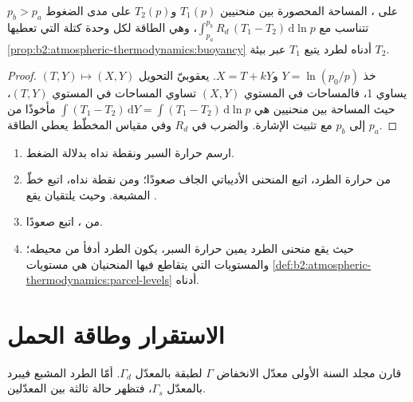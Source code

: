 \begin{proposition}\label{prop:b2:atmospheric-thermodynamics:areas}
على ، المساحة المحصورة بين منحنيين $T_1(p)$ و$T_2(p)$ على مدى
الضغوط $p_b > p_a$ تتناسب مع $\int_{p_a}^{p_b} R_d\,(T_1 - T_2)\,\mathrm{d}\ln p$،
وهي الطاقة لكل وحدة كتلة التي تعطيها \cref{prop:b2:atmospheric-thermodynamics:buoyancy} أدناه
لطرد يتبع $T_1$ عبر بيئة $T_2$.
\end{proposition}

\begin{proof}
خذ $Y = \ln(p_0/p)$ و$X = T + kY$. يعقوبيّ التحويل $(T, Y) \mapsto (X, Y)$ يساوي 1، فالمساحات في
المستوي $(X, Y)$ تساوي المساحات في المستوي $(T, Y)$، حيث المساحة بين منحنيين هي
$\int (T_1 - T_2)\,\mathrm{d}Y = \int (T_1 - T_2)\,\mathrm{d}\ln p$ مأخوذًا من $p_a$ إلى $p_b$
مع تثبيت الإشارة. والضرب في $R_d$ وفي مقياس المخطّط يعطي الطاقة.
\end{proof}

\begin{method}\label{met:b2:atmospheric-thermodynamics:lift}
\begin{enumerate}
  \item ارسم حرارة السبر ونقطة نداه بدلالة الضغط.
  \item من حرارة الطرد، اتبع المنحنى الأديباتي الجاف صعودًا؛ ومن نقطة نداه، اتبع
        خطّ  المشبعة. وحيث يلتقيان يقع .
  \item من ، اتبع  صعودًا.
  \item حيث يقع منحنى الطرد يمين حرارة السبر، يكون الطرد
        أدفأ من محيطه؛ والمستويات التي يتقاطع فيها المنحنيان هي مستويات
        \cref{def:b2:atmospheric-thermodynamics:parcel-levels} أدناه.
\end{enumerate}
\end{method}


\section{الاستقرار وطاقة الحمل}\label{sec:b2:atmospheric-thermodynamics:stability}

قارن مجلد السنة الأولى معدّل الانخفاض $\Gamma$ لطبقة بالمعدّل $\Gamma_d$. أمّا الطرد المشبع
فيبرد بالمعدّل $\Gamma_s$، فتظهر حالة ثالثة بين المعدّلين.

